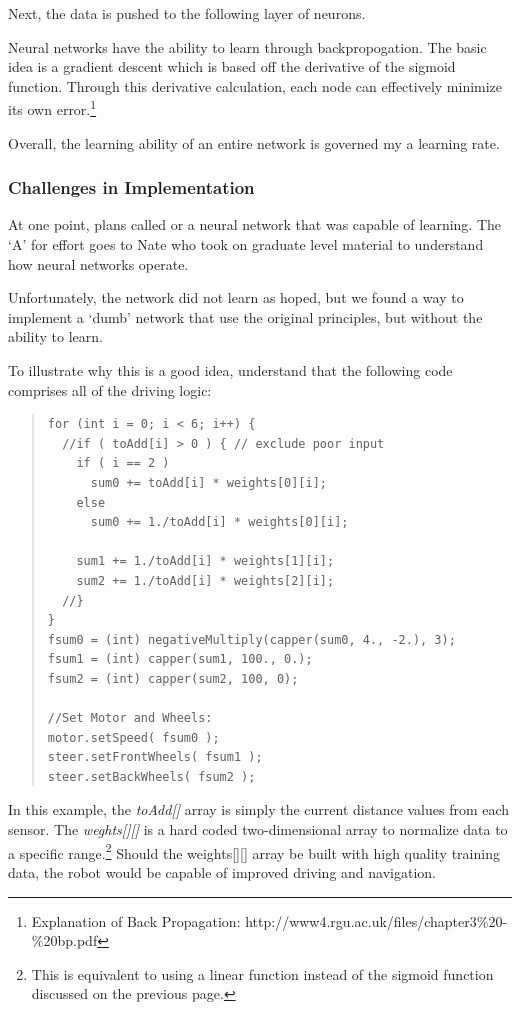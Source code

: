\documentclass[12pt]{article}
\begin{document}
Next, the data is pushed to the following layer of neurons.

Neural networks have the ability to learn through backpropogation.  The basic idea is a gradient descent which is based off the derivative of the sigmoid function.  Through this derivative calculation, each node can effectively minimize its own error.\footnote{Explanation of Back Propagation: http://www4.rgu.ac.uk/files/chapter3\%20-\%20bp.pdf}


Overall, the learning ability of an entire network is governed my a learning rate.

\subsubsection*{Challenges in Implementation}
At one point, plans called or a neural network that was capable of learning.  The `A' for effort goes to Nate who took on graduate level material to understand how neural networks operate.

Unfortunately, the network did not learn as hoped, but we found a way to implement a `dumb' network that use the original principles, but without the ability to learn.

To illustrate why this is a good idea, understand that the following code comprises all of the driving logic:
\begin{quote}
\begin{verbatim}
for (int i = 0; i < 6; i++) {
  //if ( toAdd[i] > 0 ) { // exclude poor input
    if ( i == 2 )
      sum0 += toAdd[i] * weights[0][i];
    else
      sum0 += 1./toAdd[i] * weights[0][i];

    sum1 += 1./toAdd[i] * weights[1][i];
    sum2 += 1./toAdd[i] * weights[2][i];
  //}
}
fsum0 = (int) negativeMultiply(capper(sum0, 4., -2.), 3);
fsum1 = (int) capper(sum1, 100., 0.);
fsum2 = (int) capper(sum2, 100, 0);

//Set Motor and Wheels:
motor.setSpeed( fsum0 );
steer.setFrontWheels( fsum1 );
steer.setBackWheels( fsum2 );
\end{verbatim}
\end{quote}

In this example, the \textit{toAdd[]} array is simply the current distance values from each sensor.  The \textit{weghts[][]} is a hard coded two-dimensional array to normalize data to a specific range.\footnote{This is equivalent to using a linear function instead of the sigmoid function discussed on the previous page.}  Should the weights[][] array be built with high quality training data, the robot would be capable of improved driving and navigation.
\end{document}
